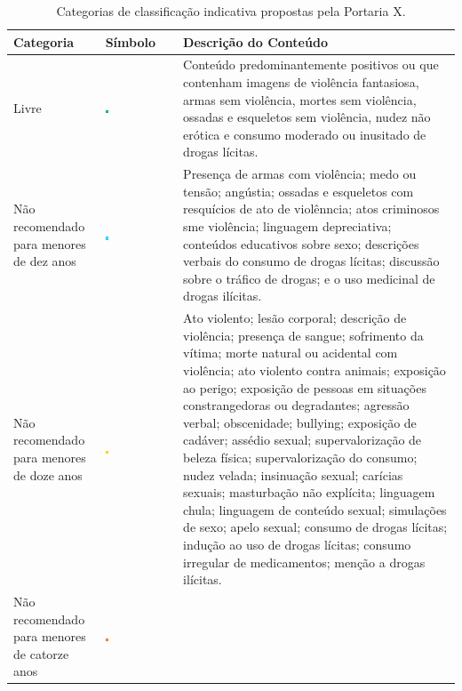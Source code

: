 \begin{table}[h!]
  \caption{Categorias de classificação indicativa propostas pela Portaria X.}
  \label{tab:categorias}
	\centering
	\begin{tabular}{p{4cm} p{1.5cm} p{9cm}}
		\hline
		\textbf{Categoria} & \textbf{Símbolo} & \textbf{Descrição do Conteúdo} \\
		\hline
		Livre & \vfill\includegraphics[width=0.05\textwidth]{img/livre.png} \vfill&
				Conteúdo predominantemente positivos ou que contenham imagens de violência fantasiosa, armas sem violência, mortes sem violência, ossadas e esqueletos sem violência, nudez não erótica e consumo moderado ou inusitado de drogas lícitas. \\
		\hline
		Não recomendado para menores de dez anos &\vfill \includegraphics[width=0.05\textwidth]{img/10anos.png}\vfill &
		 		Presença de armas com violência; medo ou tensão; angústia; ossadas e esqueletos com resquícios de ato de violênncia; atos criminosos sme violência; linguagem depreciativa; conteúdos educativos sobre sexo; descrições verbais do consumo de drogas lícitas; discussão sobre o tráfico de drogas; e o uso medicinal de drogas ilícitas.\\
		\hline
		Não recomendado para menores de doze anos &\vfill \includegraphics[width=0.05\textwidth]{img/12anos.png}\vfill &
				Ato violento; lesão corporal; descrição de violência; presença de sangue; sofrimento da vítima; morte natural ou acidental com violência; ato violento contra animais; exposição ao perigo; exposição de pessoas em situações constrangedoras ou degradantes; agressão verbal; obscenidade; bullying; exposição de cadáver; assédio sexual; supervalorização de beleza física; supervalorização do consumo; nudez velada; insinuação sexual; carícias sexuais; masturbação não explícita; linguagem chula; linguagem de conteúdo sexual; simulações de sexo; apelo sexual; consumo de drogas lícitas; indução ao uso de drogas lícitas; consumo irregular de medicamentos; menção a drogas ilícitas.\\
		\hline
		Não recomendado para menores de catorze anos &\vfill \includegraphics[width=0.05\textwidth]{img/14anos.png}\vfill &

\end{tabular}
\end{table}
